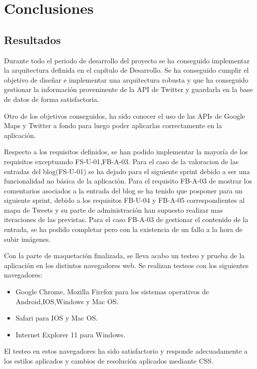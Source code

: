 \chapter{Conclusiones}

\section{Resultados}

Durante todo el periodo de desarrollo del proyecto se ha conseguido implementar la arquitectura definida en el capítulo de Desarrollo. Se ha conseguido cumplir el objetivo
de diseñar e implementar una arquitectura robusta y que ha conseguido gestionar la información proveninente de la API de Twitter y guardarla en la base de datos de forma
satisfactoria.

Otro de los objetivos conseguidos, ha sido conocer el uso de las APIs de Google Maps y Twitter a fondo para luego poder aplicarlas correctamente
en la aplicación.

Respecto a los requisitos definidos, se han podido implementar la mayoría de los requisitos exceptuando FS-U-01,FB-A-03. Para el caso de la valoracion de las
entradas del blog(FS-U-01) se ha dejado para el siguiente sprint debido a ser una funcionalidad no básica de la aplicación. Para el requisito FB-A-03
de mostrar los comentarios asociados a la entrada del blog se ha tenido que posponer para un siguiente sprint, debido a los requisitos FB-U-04 y FB-A-05 correspondientes
al mapa de Tweets y su parte de administración han supuesto realizar mas iteraciones de las previstas. Para el caso FB-A-03 de gestionar el contenido de la entrada, se ha
podido completar pero con la existencia de un fallo a la hora de subir imágenes.


Con la parte de maquetación finalizada, se lleva acabo un testeo y prueba de la aplicación en los distintos navegadores web. Se realizan testeos con los siguientes
navegadores:

\begin{itemize}
\item Google Chrome, Mozilla Firefox para los sistemas operativos de Android,IOS,Windows y Mac OS.
\item Safari para IOS y Mac OS.
\item Internet Explorer 11 para Windows.
\end{itemize}

El testeo en estos navegadores ha sido satisfactorio y responde adecuadamente a los estilos aplicados y cambios de resolución aplicados mediante CSS.

